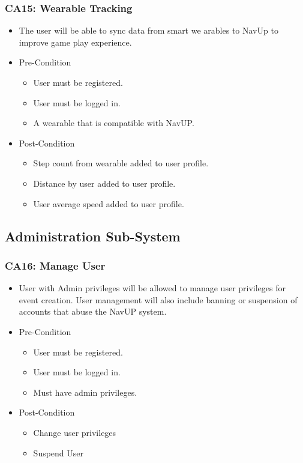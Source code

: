 \documentclass[12pt,a4paper]{article}
\begin{document}
		\subsubsection{CA15: Wearable Tracking}
			\begin{itemize}
				\item The user will be able to sync data from smart we arables to NavUp to improve game play experience.
				\item Pre-Condition
					\begin{itemize}
						\item User must be registered.
						\item User must be logged in.
						\item A wearable that is compatible with NavUP.
					\end{itemize}
				\item Post-Condition
					\begin{itemize}
						\item Step count from wearable added to user profile.
						\item Distance  by user added to user profile.
						\item User average speed added to user profile.
					\end{itemize}
			\end{itemize}
	\subsection{Administration Sub-System}
		\subsubsection{CA16: Manage User}
			\begin{itemize}
				\item User with Admin privileges will be allowed to manage user privileges for event creation. User management will also include banning or suspension of accounts that abuse the NavUP system.
				\item Pre-Condition
					\begin{itemize}
						\item User must be registered.
						\item User must be logged in.
						\item Must have admin privileges.
					\end{itemize}
				\item Post-Condition
					\begin{itemize}
						\item Change user privileges
						\item Suspend User
					\end{itemize}
			\end{itemize}
\end{document}
